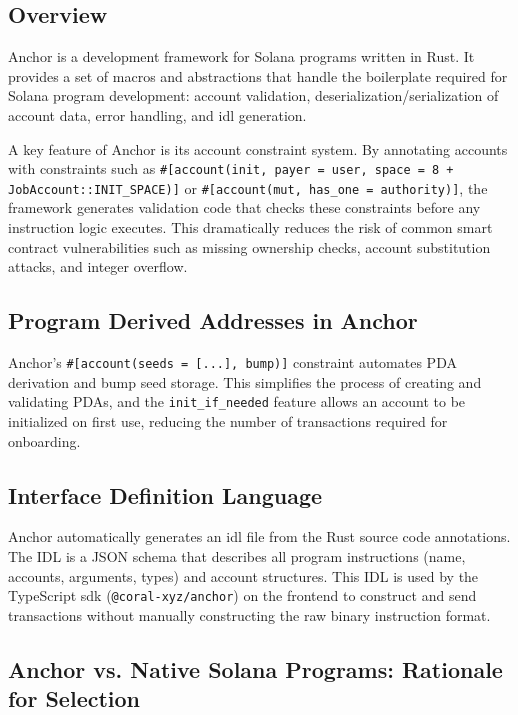 \subsection{Overview}

Anchor \cite{anchor2021} is a development framework for Solana programs written in Rust. It provides a set of macros and abstractions that handle the boilerplate required for Solana program development: account validation, deserialization/serialization of account data, error handling, and \gls{idl} generation.

A key feature of Anchor is its account constraint system. By annotating accounts with constraints such as \texttt{\#[account(init, payer = user, space = 8 + JobAccount::INIT\_SPACE)]} or \texttt{\#[account(mut, has\_one = authority)]}, the framework generates validation code that checks these constraints before any instruction logic executes. This dramatically reduces the risk of common smart contract vulnerabilities such as missing ownership checks, account substitution attacks, and integer overflow.

\subsection{Program Derived Addresses in Anchor}

Anchor's \texttt{\#[account(seeds = [...], bump)]} constraint automates PDA derivation and bump seed storage. This simplifies the process of creating and validating PDAs, and the \texttt{init\_if\_needed} feature allows an account to be initialized on first use, reducing the number of transactions required for onboarding.

\subsection{Interface Definition Language}

Anchor automatically generates an \gls{idl} file from the Rust source code annotations. The IDL is a JSON schema that describes all program instructions (name, accounts, arguments, types) and account structures. This IDL is used by the TypeScript \gls{sdk} (\texttt{@coral-xyz/anchor}) on the frontend to construct and send transactions without manually constructing the raw binary instruction format.

\subsection{Anchor vs. Native Solana Programs: Rationale for Selection}

